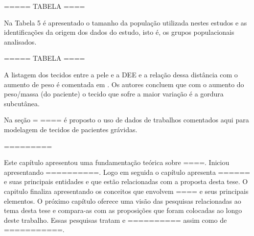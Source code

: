 ===== TABELA ====

Na Tabela 5 é apresentado o tamanho da população utilizada nestes estudos e as identificações da origem dos dados do estudo, isto é, os grupos populacionais analisados. 

===== TABELA ====

A listagem dos tecidos entre a pele e a DEE e a relação dessa distância com o aumento de peso é comentada em \cite{Palmer1983}. Os autores concluem que com o aumento do peso/massa (do paciente) o tecido que sofre a maior variação é a gordura subcutânea.

Na seção = ==== é proposto o uso de dados de trabalhos comentados aqui para modelagem de tecidos de pacientes grávidas.

=========

Este capítulo apresentou uma fundamentação teórica sobre ====. Iniciou apresentando ==========. Logo em seguida o capítulo apresenta ====== e suas principais entidades e que estão relacionadas com a proposta desta tese. O capitulo finaliza apresentando os conceitos que envolvem ==== e seus principais elementos. O próximo capítulo oferece uma visão das pesquisas relacionadas ao tema desta tese e compara-as com as proposições que foram colocadas ao longo deste trabalho. Essas pesquisas tratam e ========== assim como de ===========.